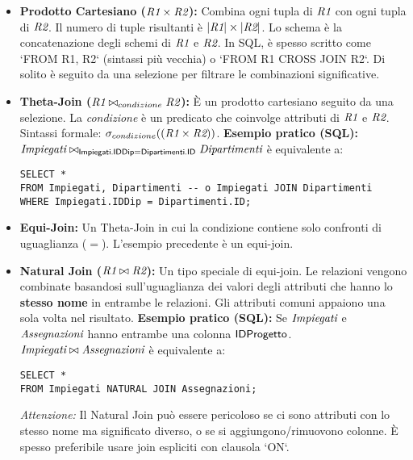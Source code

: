 	\begin{itemize}
		\item \textbf{Prodotto Cartesiano ($\textit{R1} \times \textit{R2}$):}
		Combina ogni tupla di $\textit{R1}$ con ogni tupla di $\textit{R2}$. Il numero di tuple risultanti è $|\textit{R1}| \times |\textit{R2}|$. Lo schema è la concatenazione degli schemi di $\textit{R1}$ e $\textit{R2}$.
		In SQL, è spesso scritto come `FROM R1, R2` (sintassi più vecchia) o `FROM R1 CROSS JOIN R2`. Di solito è seguito da una selezione per filtrare le combinazioni significative.
		
		\item \textbf{Theta-Join ($\textit{R1} \bowtie_{condizione} \textit{R2}$):}
		È un prodotto cartesiano seguito da una selezione. La \textit{condizione} è un predicato che coinvolge attributi di $\textit{R1}$ e $\textit{R2}$.
		Sintassi formale: $\sigma_{condizione}((\textit{R1} \times \textit{R2}))$.
		\textbf{Esempio pratico (SQL):}
		$\textit{Impiegati} \bowtie_{\textsf{Impiegati.IDDip} = \textsf{Dipartimenti.ID}} \textit{Dipartimenti}$
		è equivalente a:
		\begin{verbatim}
SELECT *
FROM Impiegati, Dipartimenti -- o Impiegati JOIN Dipartimenti
WHERE Impiegati.IDDip = Dipartimenti.ID;
		\end{verbatim}
		
		\item \textbf{Equi-Join:} Un Theta-Join in cui la condizione contiene solo confronti di uguaglianza ($=$). L'esempio precedente è un equi-join.
		
		\item \textbf{Natural Join ($\textit{R1} \bowtie \textit{R2}$):}
		Un tipo speciale di equi-join. Le relazioni vengono combinate basandosi sull'uguaglianza dei valori degli attributi che hanno lo \textbf{stesso nome} in entrambe le relazioni. Gli attributi comuni appaiono una sola volta nel risultato.
		\textbf{Esempio pratico (SQL):} Se $\textit{Impiegati}$ e $\textit{Assegnazioni}$ hanno entrambe una colonna $\textsf{IDProgetto}$.
		$\textit{Impiegati} \bowtie \textit{Assegnazioni}$
		è equivalente a:
		\begin{verbatim}
SELECT *
FROM Impiegati NATURAL JOIN Assegnazioni;
		\end{verbatim}
		\textit{Attenzione:} Il Natural Join può essere pericoloso se ci sono attributi con lo stesso nome ma significato diverso, o se si aggiungono/rimuovono colonne. È spesso preferibile usare join espliciti con clausola `ON`.
	\end{itemize}
	
